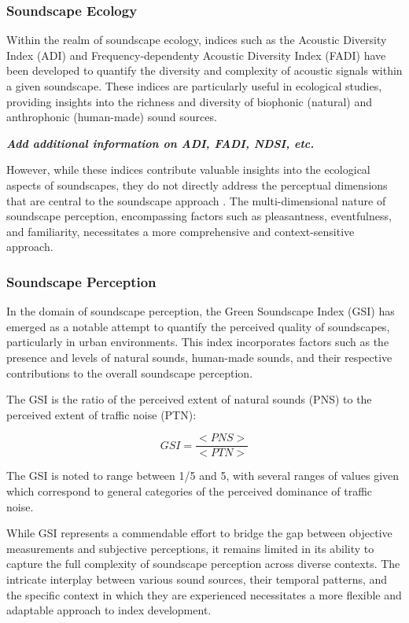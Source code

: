 \documentclass[
  authoryear,
  preprint,
  3p]{elsarticle}
\begin{document}
\subsubsection{Soundscape Ecology}\label{soundscape-ecology}

Within the realm of soundscape ecology, indices such as the Acoustic
Diversity Index (ADI) and Frequency-dependenty Acoustic Diversity Index
(FADI) \citep{Xu2023frequency} have been developed to quantify the
diversity and complexity of acoustic signals within a given soundscape.
These indices are particularly useful in ecological studies, providing
insights into the richness and diversity of biophonic (natural) and
anthrophonic (human-made) sound sources.

\textbf{\emph{Add additional information on ADI, FADI, NDSI, etc.}}

However, while these indices contribute valuable insights into the
ecological aspects of soundscapes, they do not directly address the
perceptual dimensions that are central to the soundscape approach
\citep{SchulteFortkamp2023Soundscapes}. The multi-dimensional nature of
soundscape perception, encompassing factors such as pleasantness,
eventfulness, and familiarity, necessitates a more comprehensive and
context-sensitive approach.

\subsubsection{Soundscape Perception}\label{soundscape-perception}

In the domain of soundscape perception, the Green Soundscape Index (GSI)
\citep{Kogan2018Green} has emerged as a notable attempt to quantify the
perceived quality of soundscapes, particularly in urban environments.
This index incorporates factors such as the presence and levels of
natural sounds, human-made sounds, and their respective contributions to
the overall soundscape perception.

The GSI is the ratio of the perceived extent of natural sounds (PNS) to
the perceived extent of traffic noise (PTN):

\[
GSI = \frac{<PNS>}{<PTN>}
\]

The GSI is noted to range between 1/5 and 5, with several ranges of
values given which correspond to general categories of the perceived
dominance of traffic noise.

While GSI represents a commendable effort to bridge the gap between
objective measurements and subjective perceptions, it remains limited in
its ability to capture the full complexity of soundscape perception
across diverse contexts. The intricate interplay between various sound
sources, their temporal patterns, and the specific context in which they
are experienced necessitates a more flexible and adaptable approach to
index development.
\end{document}
